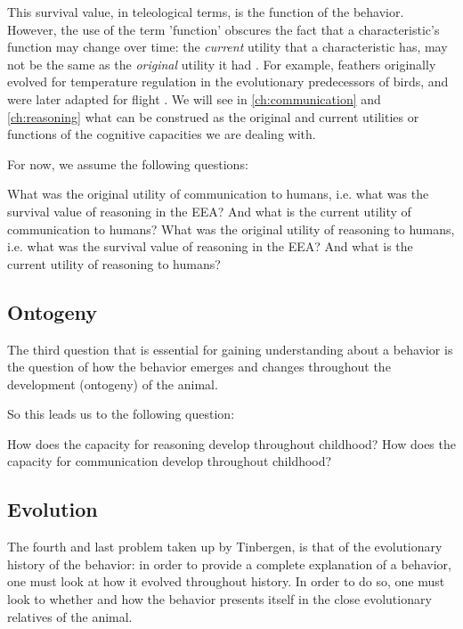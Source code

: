 This survival value, in teleological terms, is the function of the behavior.  However, the use of the term 'function' obscures the fact that a characteristic's function may change over time: the \emph{current} utility that a characteristic has, may not be the same as the \emph{original} utility it had \citep{BatesonLaland13}. For example, feathers originally evolved for temperature regulation in the evolutionary predecessors of birds, and were later adapted for flight \citep{Benton19, BatesonLaland13}.
We will see in \cref{ch:communication} and \cref{ch:reasoning} what can be construed as the original and current utilities or functions of the cognitive capacities we are dealing with.

For now, we assume the following questions:
\begin{exe}
    \ex
    \begin{xlist}
        \ex
        What was the original utility of communication to humans, i.e. what was the survival value of reasoning in the EEA? And what is the current utility of communication to humans?
        \ex
        What was the original utility of reasoning to humans, i.e. what was the survival value of reasoning in the EEA? And what is the current utility of reasoning to humans?
    \end{xlist}
\end{exe}

\subsection{Ontogeny}
The third question that is essential for gaining understanding about a behavior is the question of how the behavior emerges and changes throughout the development (ontogeny) of the animal.

So this leads us to the following question:
\begin{exe}
    \ex
    \begin{xlist}
        \ex How does the capacity for reasoning develop throughout childhood?
        \ex How does the capacity for communication develop throughout childhood?
    \end{xlist}
\end{exe}

\subsection{Evolution}
The fourth and last problem taken up by Tinbergen, is that of the evolutionary history of the behavior: in order to provide a complete explanation of a behavior, one must look at how it evolved throughout history. In order to do so, one must look to whether and how the behavior presents itself in the close evolutionary relatives of the animal.

